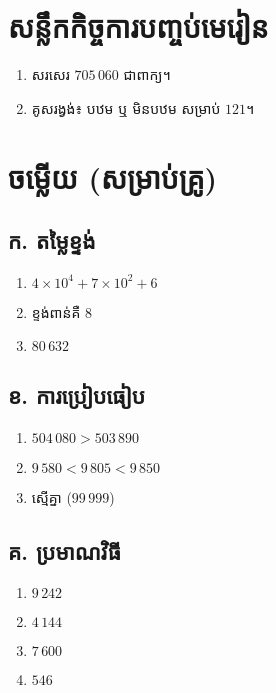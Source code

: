     \section*{សន្លឹកកិច្ចការបញ្ចប់មេរៀន}
    \begin{enumerate}[label=\arabic*.]
        \item សរសេរ $705\,060$ ជាពាក្យ។
        \item គូសរង្វង់៖ បឋម ឬ មិនបឋម សម្រាប់ $121$។
    \end{enumerate}

\section*{ចម្លើយ (សម្រាប់គ្រូ)}

\begin{multicols}{2}
    \subsection*{ក. តម្លៃខ្ទង់}
    \begin{enumerate}[label=\arabic*.]
        \item $4\times10^4 + 7\times10^2 + 6$
        \item ខ្ទង់ពាន់គឺ 8
        \item $80\,632$
    \end{enumerate}

    \subsection*{ខ. ការប្រៀបធៀប}
    \begin{enumerate}[label=\arabic*.]
        \item $504\,080 > 503\,890$
        \item $9\,580 < 9\,805 < 9\,850$
        \item ស្មើគ្នា ($99\,999$)
    \end{enumerate}

    \subsection*{គ. ប្រមាណវិធី}
    \begin{enumerate}[label=\arabic*.]
        \item $9\,242$
        \item $4\,144$
        \item $7\,600$
        \item $546$
    \end{enumerate}


\end{multicols}
